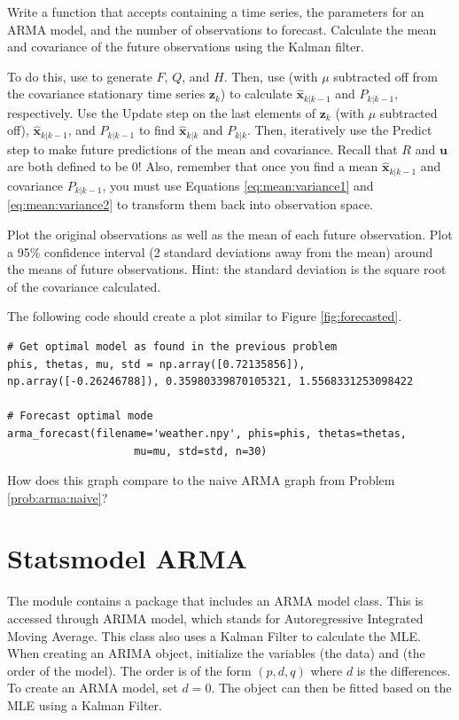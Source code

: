 \begin{problem}
\label{prob:arma:forecast}
Write a function  that accepts  containing a time series, the parameters for an ARMA model, and the number  of observations to forecast.
Calculate the mean and covariance of the future  observations using the Kalman filter.

To do this, use  to generate $F$, $Q$, and $H$.
Then, use  (with $\mu$ subtracted off from the covariance stationary time series $\mathbf{z}_k$) to calculate $\hat{\mathbf{x}}_{k|k-1}$ and $P_{k|k-1}$, respectively.
Use the Update step on the last elements of $\mathbf{z}_k$ (with $\mu$ subtracted off), $\hat{\mathbf{x}}_{k|k-1}$, and $P_{k|k-1}$ to find $\hat{\mathbf{x}}_{k|k}$ and $P_{k|k}$.
Then, iteratively use the Predict step to make future predictions of the mean and covariance.
Recall that $R$ and $\mathbf{u}$ are both defined to be 0!
Also, remember that once you find a mean $\hat{\mathbf{x}}_{k|k-1}$ and covariance $P_{k|k-1}$, you must use Equations \ref{eq:mean:variance1} and \ref{eq:mean:variance2} to transform them back into observation space.

Plot the original observations as well as the mean of each future observation.
Plot a 95\% confidence interval (2 standard deviations away from the mean) around the means of future observations.
Hint: the standard deviation is the square root of the covariance calculated.

The following code should create a plot similar to Figure \ref{fig:forecasted}.

\begin{lstlisting}
# Get optimal model as found in the previous problem
phis, thetas, mu, std = np.array([0.72135856]), np.array([-0.26246788]), 0.35980339870105321, 1.5568331253098422

# Forecast optimal mode
arma_forecast(filename='weather.npy', phis=phis, thetas=thetas, 
                    mu=mu, std=std, n=30)
\end{lstlisting}

\noindent How does this graph compare to the naive ARMA graph from Problem \ref{prob:arma:naive}?
\end{problem}

\section*{Statsmodel ARMA}

The module  contains a package that includes an ARMA model class.
This is accessed through ARIMA model, which stands for Autoregressive Integrated Moving Average.
This class also uses a Kalman Filter to calculate the MLE.
When creating an ARIMA object, initialize the variables  (the data) and  (the order of the model).
The order is of the form $(p,d,q)$ where $d$ is the differences.
To create an ARMA model, set $d=0$.
The object can then be fitted based on the MLE using a Kalman Filter.

